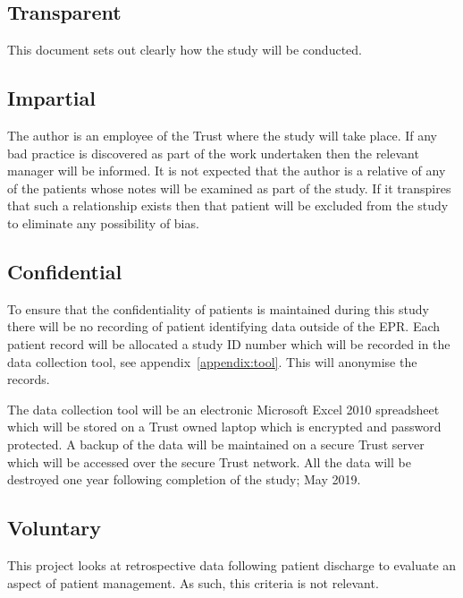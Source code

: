 \documentclass
[
	12pt,
	a4paper,
	oneside,
]{article}
\begin{document}
\subsection{Transparent}
This document sets out clearly how the study will be conducted.

\subsection{Impartial}
The author is an employee of the Trust where the study will take place. If any bad
practice is discovered as part of the work undertaken then the relevant manager
will be informed. It is not expected that the author is a relative of any of the patients
whose notes will be examined as part of the study. If it transpires that such a 
relationship exists then that patient will be excluded from the study to eliminate
any possibility of bias.

\subsection{Confidential}
To ensure that the confidentiality of patients is maintained during this study there
will be no recording of patient identifying data outside of the EPR. Each patient
record will be allocated a study ID number which will be recorded in the data collection
tool, see appendix~\ref{appendix:tool}. This will anonymise the records.

The data collection tool will be an electronic Microsoft Excel 2010 spreadsheet
which will be stored on a Trust owned laptop which is encrypted and password protected. A backup 
of the data will be maintained on a secure Trust server which will be accessed over
the secure Trust network. All the data will be destroyed one year following completion 
of the study; May 2019.

\subsection{Voluntary}

This project looks at retrospective data following patient discharge to evaluate 
an aspect of patient management. As such, this criteria is not relevant.
\end{document}
